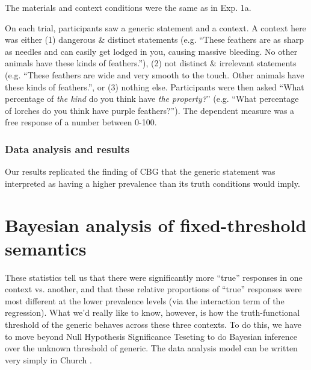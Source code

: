 \documentclass[10pt,letterpaper]{article}
\begin{document}
The materials and context conditions were the same as in Exp. 1a. 

On each trial, participants saw a generic statement and a context. A context here was either (1) dangerous \& distinct statements (e.g. ``These feathers are as sharp as needles and can easily get lodged in you, causing massive bleeding. No other animals have these kinds of feathers.''), (2) not distinct \& irrelevant statements (e.g. ``These feathers are wide and very smooth to the touch. Other animals have these kinds of feathers.'', or (3) nothing else. Participants were then asked ``What percentage of \emph{the kind} do you think have \emph{the property?}'' (e.g. ``What percentage of lorches do you think have  purple feathers?''). The dependent measure was a free response of a number between 0-100. 

\subsubsection{Data analysis and results}

%

Our results replicated the finding of CBG that the generic statement was interpreted as having a higher prevalence than its truth conditions would imply. 



\section{Bayesian analysis of fixed-threshold semantics}

These statistics tell us that there were significantly more ``true'' responses in one context vs. another, and that these relative proportions of ``true'' responses were most different at the lower prevalence levels (via the interaction term of the regression). What we'd really like to know, however, is how the truth-functional threshold of the generic behaves across these three contexts. To do this, we have to move beyond Null Hypothesis Significance Teseting to do Bayesian inference over the unknown threshold of generic. The data analysis model can be written very simply in Church \cite{probmods}.
\end{document}
